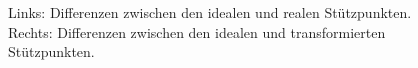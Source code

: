 \begin{figure}[H]
	\caption{Links: Differenzen zwischen den idealen und realen Stützpunkten. \\Rechts: Differenzen zwischen den idealen und transformierten Stützpunkten.}
	\label{fig:diffsResult}
\end{figure}



